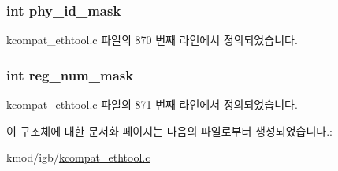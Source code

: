 \subsubsection[{\texorpdfstring{phy\+\_\+id\+\_\+mask}{phy_id_mask}}]{\setlength{\rightskip}{0pt plus 5cm}int phy\+\_\+id\+\_\+mask}\hypertarget{struct__kc__mii__if__info_a24aee225a18d3893088ea87146dfb3d0}{}\label{struct__kc__mii__if__info_a24aee225a18d3893088ea87146dfb3d0}


kcompat\+\_\+ethtool.\+c 파일의 870 번째 라인에서 정의되었습니다.

\subsubsection[{\texorpdfstring{reg\+\_\+num\+\_\+mask}{reg_num_mask}}]{\setlength{\rightskip}{0pt plus 5cm}int reg\+\_\+num\+\_\+mask}\hypertarget{struct__kc__mii__if__info_a90947234b59deb110e0c9f322f1f1104}{}\label{struct__kc__mii__if__info_a90947234b59deb110e0c9f322f1f1104}


kcompat\+\_\+ethtool.\+c 파일의 871 번째 라인에서 정의되었습니다.



이 구조체에 대한 문서화 페이지는 다음의 파일로부터 생성되었습니다.\+:\begin{DoxyCompactItemize}
\item 
kmod/igb/\hyperlink{kcompat__ethtool_8c}{kcompat\+\_\+ethtool.\+c}\end{DoxyCompactItemize}
